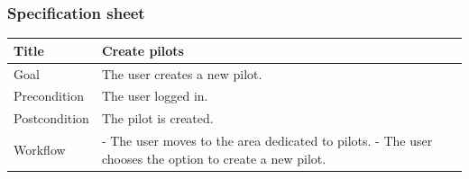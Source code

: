 \documentclass{beamer}
\begin{document}
\begin{frame}
    \frametitle{Specification sheet}
    \begin{table}
        \tiny
        \begin{tabular}{|p{2cm}|p{6cm}|}
        \hline  
        Title & \textbf{Create pilots} \\
        \hline
        Goal & The user creates a new pilot. \\
        \hline
        Precondition & The user logged in. \\
        \hline
        Postcondition & The pilot is created. \\
        \hline
        Workflow &
        - The user moves to the area dedicated to pilots. \newline
        - The user chooses the option to create a new pilot. \\
        \hline
        \end{tabular}
\end{table}
\end{frame}
\end{document}
